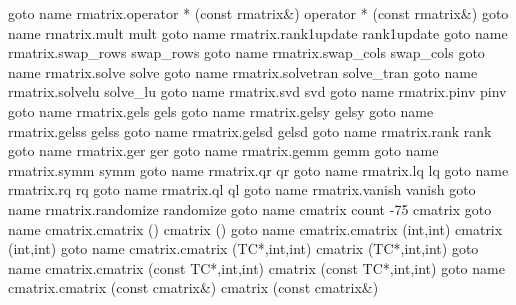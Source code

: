 \documentclass[12pt,letterpaper]{article}
\begin{document}
        \pdfoutline goto name {rmatrix.operator * (const rmatrix&)}           {operator * (const rmatrix&)}
        \pdfoutline goto name {rmatrix.mult}                                  {mult}
        \pdfoutline goto name {rmatrix.rank1update}                           {rank1update}
        \pdfoutline goto name {rmatrix.swap_rows}                             {swap_rows}
        \pdfoutline goto name {rmatrix.swap_cols}                             {swap_cols}
        \pdfoutline goto name {rmatrix.solve}                                 {solve}
        \pdfoutline goto name {rmatrix.solvetran}                             {solve_tran}
        \pdfoutline goto name {rmatrix.solvelu}                               {solve_lu}
        \pdfoutline goto name {rmatrix.svd}                                   {svd}
        \pdfoutline goto name {rmatrix.pinv}                                  {pinv}
        \pdfoutline goto name {rmatrix.gels}                                  {gels}
        \pdfoutline goto name {rmatrix.gelsy}                                 {gelsy}
        \pdfoutline goto name {rmatrix.gelss}                                 {gelss}
        \pdfoutline goto name {rmatrix.gelsd}                                 {gelsd}
        \pdfoutline goto name {rmatrix.rank}                                  {rank}
        \pdfoutline goto name {rmatrix.ger}                                   {ger}
        \pdfoutline goto name {rmatrix.gemm}                                  {gemm}
        \pdfoutline goto name {rmatrix.symm}                                  {symm}
        \pdfoutline goto name {rmatrix.qr}                                    {qr}
        \pdfoutline goto name {rmatrix.lq}                                    {lq}
        \pdfoutline goto name {rmatrix.rq}                                    {rq}
        \pdfoutline goto name {rmatrix.ql}                                    {ql}
        \pdfoutline goto name {rmatrix.vanish}                                {vanish}
        \pdfoutline goto name {rmatrix.randomize}                             {randomize}
    \pdfoutline goto name {cmatrix} count -75 {cmatrix}
        \pdfoutline goto name {cmatrix.cmatrix ()}                            {cmatrix ()}
        \pdfoutline goto name {cmatrix.cmatrix (int,int)}                     {cmatrix (int,int)}
        \pdfoutline goto name {cmatrix.cmatrix (TC*,int,int)}                 {cmatrix (TC*,int,int)}
        \pdfoutline goto name {cmatrix.cmatrix (const TC*,int,int)}           {cmatrix (const TC*,int,int)}
        \pdfoutline goto name {cmatrix.cmatrix (const cmatrix&)}              {cmatrix (const cmatrix&)}
\end{document}
